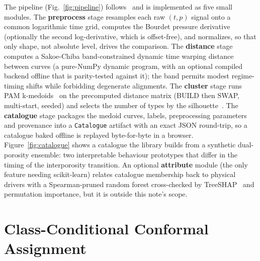 \documentclass[journal]{IEEEtran}
\begin{document}
The pipeline (Fig.~\ref{fig:pipeline}) follows~\cite{geotypes} and is implemented as five small modules. The
\textbf{preprocess} stage resamples each raw $(t,p)$ signal onto a common logarithmic time grid, computes the
Bourdet pressure derivative~\cite{bourdet} (optionally the second log-derivative, which is offset-free), and
normalizes, so that only shape, not absolute level, drives the comparison. The \textbf{distance} stage computes a
Sakoe-Chiba band-constrained dynamic time warping distance~\cite{sakoe} between curves (a pure-NumPy dynamic
program, with an optional compiled backend offline that is parity-tested against it); the band permits modest
regime-timing shifts while forbidding degenerate alignments. The \textbf{cluster} stage runs PAM
k-medoids~\cite{kaufman} on the precomputed distance matrix (BUILD then SWAP, multi-start, seeded) and selects the
number of types by the silhouette~\cite{rousseeuw}. The \textbf{catalogue} stage packages the medoid curves,
labels, preprocessing parameters and provenance into a \texttt{Catalogue} artifact with an exact JSON round-trip,
so a catalogue baked offline is replayed byte-for-byte in a browser. Figure~\ref{fig:catalogue} shows a catalogue
the library builds from a synthetic dual-porosity ensemble: two interpretable behaviour prototypes that differ in
the timing of the interporosity transition. An optional \textbf{attribute} module (the only feature needing
scikit-learn) relates catalogue membership back to physical drivers with a Spearman-pruned random forest
cross-checked by TreeSHAP~\cite{shap} and permutation importance, but it is outside this note's scope.

\section{Class-Conditional Conformal Assignment}\label{sec:conformal}
\end{document}
